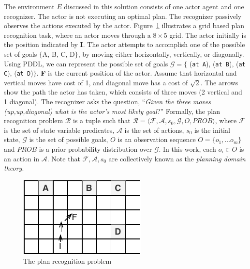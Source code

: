 The environment $E$ discussed in this solution consists of one actor agent and one recognizer. The actor is not executing an optimal plan. The recognizer passively observes the actions executed by the actor. 
Figure~\ref{fig:prp} illustrates a grid based plan recognition task, where an actor moves through a $8\times5$ grid. 
The actor initially is the position indicated by \textbf{I}. 
The actor attempts to accomplish one of the possible set of goals $\lbrace$A, B, C, D$\rbrace$, by moving either horizontally, vertically, or diagonally. 
Using PDDL, we can represent the possible set of goals $\mathcal{G}=\lbrace$ (\texttt{at A}), (\texttt{at B}), (\texttt{at C}), (\texttt{at D})$\rbrace$. \textbf{F} is the current position of the actor. 
Assume that horizontal and vertical moves have cost of 1, and diagonal move has a cost of $\sqrt{2}$. 
The arrows show the path the actor has taken, which consists of three moves (2 vertical and 1 diagonal). The recognizer asks the question, ``\textit{Given the three moves (up,up,diagonal) what is the actor's most likely goal}?'' Formally, the plan recognition problem $\mathcal{R}$ is a tuple such that $\mathcal{R}=\langle \mathcal{F}, \mathcal{A}, s_0, \mathcal{G}, O, PROB\rangle$, where $\mathcal{F}$ is the set of state variable predicates, $\mathcal{A}$ is the set of actions, $s_0$ is the initial state, $\mathcal{G}$ is the set of possible goals, $O$ is an observation sequence $O=\lbrace o_1,\ldots o_m\rbrace$ and $PROB$ is a prior probability distribution over $\mathcal{G}$. 
In this work, each $o_i\in O$ is an action in $\mathcal{A}$.
Note that $\mathcal{F}, \mathcal{A}, s_0$ are collectively known as the \textit{planning domain theory}.

\begin{figure}[tbp]
  \centering
\includegraphics[width=0.5\columnwidth]{img/rg.pdf}
  \caption{The plan recognition problem}
  \label{fig:prp}
\end{figure}

